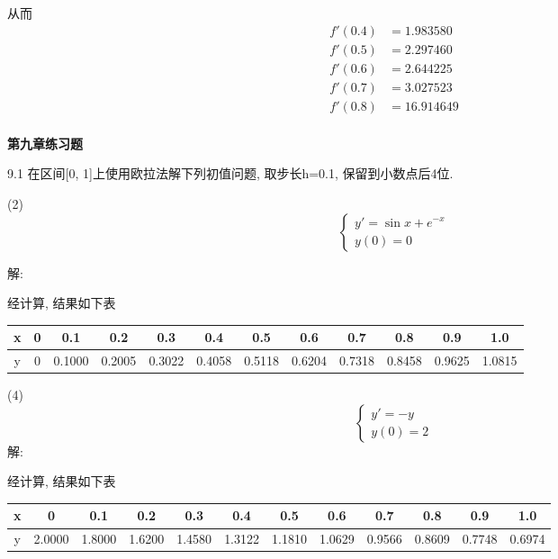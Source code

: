 \documentclass[a4paper, 10pt]{article}
\begin{document}
\begin{CJK}{UTF8}{gbsn}
从而 \\

\begin{align*}
	f'(0.4) & =  1.983580 \\
	f'(0.5) & =  2.297460 \\
	f'(0.6) & =  2.644225 \\
	f'(0.7) & =  3.027523 \\
	f'(0.8) & = 16.914649 \\
\end{align*}

\textbf{第九章练习题}

9.1
在区间[0, 1]上使用欧拉法解下列初值问题, 取步长h=0.1, 保留到小数点后4位.

(2)
\begin{equation*}
	\begin{cases}
		y' = \sin{x}+e^{-x} \\
		y(0) = 0
	\end{cases}
\end{equation*}

解:

经计算, 结果如下表
\begin{table}[h]
	\centering
	\begin{tabular}{c|c c c c c c c c c c c}
		\hline
		x & 0 & 0.1 & 0.2 & 0.3 & 0.4 & 0.5 & 0.6 & 0.7 & 0.8 & 0.9 & 1.0 \\
		\hline
		y & 0 & 0.1000 & 0.2005 & 0.3022 & 0.4058 & 0.5118 & 0.6204 & 0.7318 & 0.8458 & 0.9625 & 1.0815 \\
		\hline
	\end{tabular}
\end{table}

(4)
\begin{equation*}
	\begin{cases}
		y' = -y \\
		y(0) = 2
	\end{cases}
\end{equation*}
解:

经计算, 结果如下表
\begin{table}[h]
	\begin{tabular}{c|c c c c c c c c c c c}
		\hline
		x & 0 & 0.1 & 0.2 & 0.3 & 0.4 & 0.5 & 0.6 & 0.7 & 0.8 & 0.9 & 1.0 \\
		\hline
		y & 2.0000 & 1.8000 & 1.6200 & 1.4580 & 1.3122 & 1.1810 & 1.0629 & 0.9566 & 0.8609 & 0.7748 & 0.6974 \\
		\hline
	\end{tabular}
\end{table}


\end{CJK}
\end{document}
